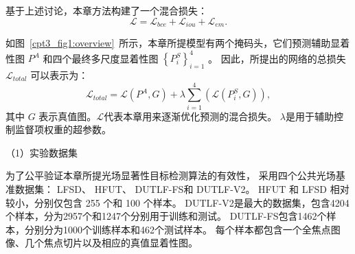 基于上述讨论，本章方法构建了一个混合损失：
%
%
%
\begin{equation} 
	\mathcal L = \mathcal L_{bce} + \mathcal L_{iou}  + \mathcal L_{em}  .
\end{equation}
%
%
%
%
\par
%
%
如图~\ref{cpt3_fig1:overview}~所示，本章所提模型有两个掩码头，它们预测辅助显着性图 $ P^{A} $ 和四个最终多尺度显着性图 $ \left \{ P_{i}^{S} \right \}_{i=1}^{4} $ 。 因此，所提出的网络的总损失 $ \mathcal L_{total} $ 可以表示为： 
%
\begin{equation}
	\mathcal L_{total} = \mathcal L\left ( P^{A}, G \right ) + \lambda  \sum_{i=1}^{4} \left ( \mathcal L \left (  P_{i}^{S},G \right )\right ),
	\label{chpt3:equ:loss_total}
\end{equation}
%
%
%
其中 $ G $ 表示真值图。$ \mathcal L $代表本章用来逐渐优化预测的混合损失。 $ \lambda $是用于辅助控制监督项权重的超参数。























（1）实验数据集


为了公平验证本章所提光场显著性目标检测算法的有效性，
采用四个公共光场基准数据集：
LFSD、
HFUT、
DUTLF-FS和 
DUTLF-V2。 
HFUT 和 LFSD 相对较小，分别仅包含 255 个和 100 个样本。 
DUTLF-V2是最大的数据集，包含4204个样本，分为2957个和1247个分别用于训练和测试。 
DUTLF-FS包含1462个样本，分别分为1000个训练样本和462个测试样本。 
每个样本都包含一个全焦点图像、几个焦点切片以及相应的真值显着性图。









